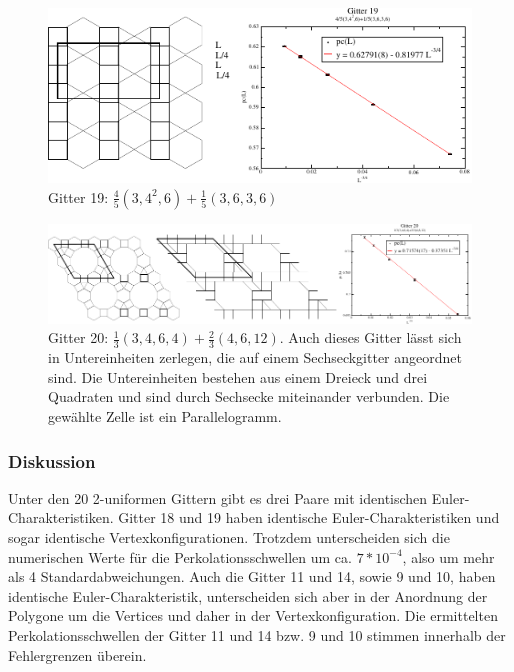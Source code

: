 \begin{figure}[tbp]
  \includegraphics{./Numerik-figs/2-uni-19_fig}
  \caption{Gitter 19:  $\frac{4}{5}(3,4^2,6)+\frac{1}{5}(3,6,3,6)$}
\end{figure}
\clearpage
\begin{figure}[tbp]
  \includegraphics{./Numerik-figs/2-uni-20_fig}
  \caption{Gitter 20: $\frac{1}{3}(3,4,6,4)+\frac{2}{3}(4,6,12)$. Auch dieses Gitter l\"asst sich in Untereinheiten zerlegen, die auf einem Sechseckgitter angeordnet sind. Die Untereinheiten bestehen aus einem Dreieck und drei Quadraten und sind durch Sechsecke miteinander verbunden. Die gew\"ahlte Zelle ist ein Parallelogramm.}
\end{figure}



\subsubsection{Diskussion}
Unter den 20 2-uniformen Gittern gibt es drei Paare mit identischen Euler-Charakteristiken. Gitter 18 und 19 haben identische Euler-Charakteristiken und sogar identische Vertexkonfigurationen. Trotzdem unterscheiden sich die numerischen Werte f\"ur die Perkolationsschwellen um ca. $7*10^{-4}$, also um mehr als 4 Standardabweichungen. Auch die Gitter 11 und 14, sowie 9 und 10, haben identische Euler-Charakteristik, unterscheiden sich aber in der Anordnung der Polygone um die Vertices und daher in der Vertexkonfiguration. Die ermittelten Perkolationsschwellen der Gitter 11 und 14 bzw. 9 und 10 stimmen innerhalb der Fehlergrenzen \"uberein.




